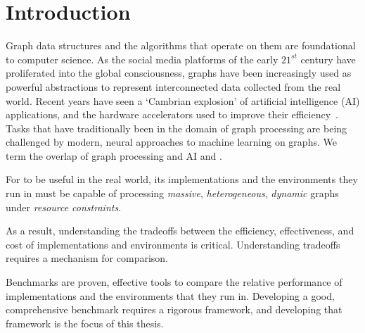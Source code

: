\renewcommand{\thechapter}{1}
\chapter{Introduction}
\label{chapter:10-Introduction}
Graph data structures and the algorithms that operate on them are foundational to computer science.
As the social media platforms of the early $21^{st}$ century have proliferated into the global consciousness, graphs have been increasingly used as powerful abstractions to represent interconnected data collected from the real world. 
Recent years have seen a `Cambrian explosion' of artificial intelligence (AI) applications, and the hardware accelerators used to improve their efficiency~\cite{Regli2022b}.
Tasks that have traditionally been in the domain of graph processing are being challenged by modern,  neural approaches to machine learning on graphs.
We term the overlap of graph processing and AI and \gai.

For \gai to be useful in the real world,  its implementations and the environments they run in must be capable of processing \textit{massive}, \textit{heterogeneous}, \textit{dynamic} graphs under \textit{resource constraints}. 

As a result, understanding the tradeoffs between the efficiency, effectiveness, and cost of \gai implementations and environments is critical.
Understanding tradeoffs requires a mechanism for comparison. 


Benchmarks are  proven, effective tools to compare the relative performance of implementations and the environments that they run in. 
Developing a  good, comprehensive benchmark requires a rigorous framework,  and developing that framework is the focus of this thesis. 

